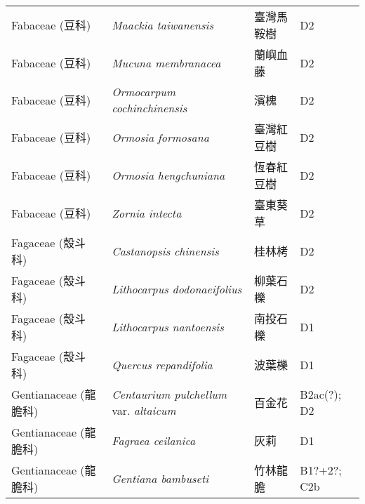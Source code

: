 \begin{longtable}{p{3cm}p{5cm}p{3cm}p{4cm}}
    Fabaceae (豆科) & \textit{Maackia taiwanensis}  & 臺灣馬鞍樹 & D2 \index{Maackia@\textit{Maackia}!taiwanensis@\textit{taiwanensis}}  \index{臺灣馬鞍樹} \\
    Fabaceae (豆科) & \textit{Mucuna membranacea}  & 蘭嶼血藤 & D2 \index{Mucuna@\textit{Mucuna}!membranacea@\textit{membranacea}}  \index{蘭嶼血藤} \\
    Fabaceae (豆科) & \textit{Ormocarpum cochinchinensis}  & 濱槐 & D2 \index{Ormocarpum@\textit{Ormocarpum}!cochinchinensis@\textit{cochinchinensis}}  \index{濱槐} \\
    Fabaceae (豆科) & \textit{Ormosia formosana}  & 臺灣紅豆樹 & D2 \index{Ormosia@\textit{Ormosia}!formosana@\textit{formosana}}  \index{臺灣紅豆樹} \\
    Fabaceae (豆科) & \textit{Ormosia hengchuniana}  & 恆春紅豆樹 & D2 \index{Ormosia@\textit{Ormosia}!hengchuniana@\textit{hengchuniana}}  \index{恆春紅豆樹} \\
    Fabaceae (豆科) & \textit{Zornia intecta}  & 臺東葵草 & D2 \index{Zornia@\textit{Zornia}!intecta@\textit{intecta}}  \index{臺東葵草} \\
    Fagaceae (殼斗科) & \textit{Castanopsis chinensis}  & 桂林栲 & D2 \index{Castanopsis@\textit{Castanopsis}!chinensis@\textit{chinensis}}  \index{桂林栲} \\
    Fagaceae (殼斗科) & \textit{Lithocarpus dodonaeifolius}  & 柳葉石櫟 & D2 \index{Lithocarpus@\textit{Lithocarpus}!dodonaeifolius@\textit{dodonaeifolius}}  \index{柳葉石櫟} \\
    Fagaceae (殼斗科) & \textit{Lithocarpus nantoensis}  & 南投石櫟 & D1 \index{Lithocarpus@\textit{Lithocarpus}!nantoensis@\textit{nantoensis}}  \index{南投石櫟} \\
    Fagaceae (殼斗科) & \textit{Quercus repandifolia}  & 波葉櫟 & D1 \index{Quercus@\textit{Quercus}!repandifolia@\textit{repandifolia}}  \index{波葉櫟} \\
    Gentianaceae (龍膽科) & \textit{Centaurium pulchellum} var. \textit{altaicum}  & 百金花 & B2ac(?); D2 \index{Centaurium@\textit{Centaurium}!pulchellum@\textit{pulchellum}!var. altaicum@var. \textit{altaicum}}  \index{百金花} \\
    Gentianaceae (龍膽科) & \textit{Fagraea ceilanica}  & 灰莉 & D1 \index{Fagraea@\textit{Fagraea}!ceilanica@\textit{ceilanica}}  \index{灰莉} \\
    Gentianaceae (龍膽科) & \textit{Gentiana bambuseti}  & 竹林龍膽 & B1?+2?; C2b \index{Gentiana@\textit{Gentiana}!bambuseti@\textit{bambuseti}}  \index{竹林龍膽} \\

\end{longtable}
